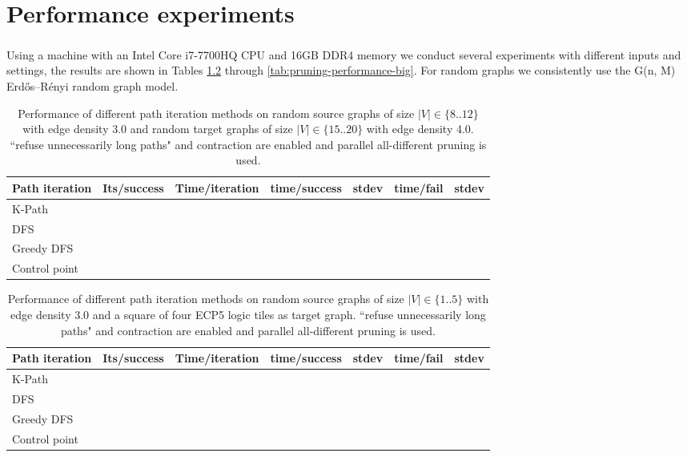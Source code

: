 \chapter{Performance experiments}
Using a machine with an Intel\textsuperscript{\textregistered} Core\textsuperscript{\texttrademark} i7-7700HQ CPU and 16GB DDR4 memory we conduct several experiments with different inputs and settings, the results are shown in Tables \ref{tab:iterator-performance} through \ref{tab:pruning-performance-big}. For random graphs we consistently use the G(n, M) Erdős–Rényi random graph model.

\begin{table}[ht]
\centering
\begin{tabular}{|l|l|l|l|l|l|l|}
\hline
\textbf{Path iteration} &
  \textbf{Its/success} &
  \textbf{Time/iteration} &
  \textbf{time/success} &
  \textbf{stdev} &
  \textbf{time/fail} &
  \textbf{stdev} \\ \hline
K-Path        &  &  &  &  &  &  \\ \hline
DFS           &  &  &  &  &  &  \\ \hline
Greedy DFS    &  &  &  &  &  &  \\ \hline
Control point &  &  &  &  &  &  \\ \hline
\end{tabular}
\caption{Performance of different path iteration methods on random source graphs of size $|V|\in \{8..12\}$ with edge density 3.0 and random target graphs of size $|V|\in \{15..20\}$ with edge density 4.0. ``refuse unnecessarily long paths" and contraction are enabled and parallel all-different pruning is used.}
\label{tab:iterator-performance}
\end{table}




\begin{table}[ht]
\centering
\begin{tabular}{|l|l|l|l|l|l|l|}
\hline
\textbf{Path iteration} &
  \textbf{Its/success} &
  \textbf{Time/iteration} &
  \textbf{time/success} &
  \textbf{stdev} &
  \textbf{time/fail} &
  \textbf{stdev} \\ \hline
K-Path        &  &  &  &  &  &  \\ \hline
DFS           &  &  &  &  &  &  \\ \hline
Greedy DFS    &  &  &  &  &  &  \\ \hline
Control point &  &  &  &  &  &  \\ \hline
\end{tabular}
\caption{Performance of different path iteration methods on random source graphs of size $|V|\in \{1..5\}$ with edge density 3.0 and a square of four ECP5 logic tiles as target graph. ``refuse unnecessarily long paths" and contraction are enabled and parallel all-different pruning is used.}
\label{tab:iterator-performance}
\end{table}

